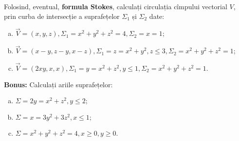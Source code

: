 \vspace{0.3cm}

Folosind, eventual, \textbf{formula Stokes}, calculați circulația cîmpului vectorial $ V $,
prin curba de intersecție a suprafețelor $ \Sigma_1 $ și $ \Sigma_2 $ date:
\begin{enumerate}[(a)]
    \item $ \vec{V} = (x, y, z), \Sigma_1 = x^2 + y^2 + z^2 = 4, \Sigma_2 = x = 1 $;
    \item $ \vec{V} = (x - y, z - y, x - z), \Sigma_1 = z = x^2 + y^2, z \leq 3, \Sigma_2 = x^2 + y^2 + z^2 = 1 $;
    \item $ \vec{V} = (2xy, x, x), \Sigma_1 = y = x^2 + z^2, y \leq 1, \Sigma_2 = x^2 + y^2 + z^2 = 1 $.
\end{enumerate}

\vspace{0.3cm}

\textbf{Bonus:} Calculați ariile suprafețelor:
\begin{enumerate}[(a)]
    \item $ \Sigma = 2y = x^2 + z^2, y \leq 2 $;
    \item $ \Sigma = x = 3y^2 + 3z^2, x \leq 1 $;
    \item $ \Sigma = x^2 + y^2 + z^2 = 4, x \geq 0, y \geq 0 $.
\end{enumerate}